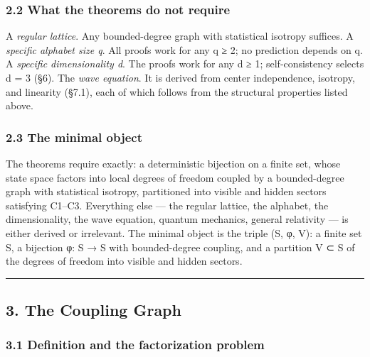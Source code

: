 \documentclass[
  11pt,
]{article}
\begin{document}
\hypertarget{what-the-theorems-do-not-require}{%
\subsubsection{2.2 What the theorems do not
require}\label{what-the-theorems-do-not-require}}

A \emph{regular lattice}. Any bounded-degree graph with statistical
isotropy suffices. A \emph{specific alphabet size q}. All proofs work
for any q ≥ 2; no prediction depends on q. A \emph{specific
dimensionality d}. The proofs work for any d ≥ 1; self-consistency
selects d = 3 (§6). The \emph{wave equation}. It is derived from center
independence, isotropy, and linearity (§7.1), each of which follows from
the structural properties listed above.

\hypertarget{the-minimal-object}{%
\subsubsection{2.3 The minimal object}\label{the-minimal-object}}

The theorems require exactly: a deterministic bijection on a finite set,
whose state space factors into local degrees of freedom coupled by a
bounded-degree graph with statistical isotropy, partitioned into visible
and hidden sectors satisfying C1--C3. Everything else --- the regular
lattice, the alphabet, the dimensionality, the wave equation, quantum
mechanics, general relativity --- is either derived or irrelevant. The
minimal object is the triple (S, φ, V): a finite set S, a bijection φ: S
→ S with bounded-degree coupling, and a partition V ⊂ S of the degrees
of freedom into visible and hidden sectors.

\begin{center}\rule{0.5\linewidth}{0.5pt}\end{center}

\hypertarget{the-coupling-graph}{%
\subsection{3. The Coupling Graph}\label{the-coupling-graph}}

\hypertarget{definition-and-the-factorization-problem}{%
\subsubsection{3.1 Definition and the factorization
problem}\label{definition-and-the-factorization-problem}}
\end{document}
